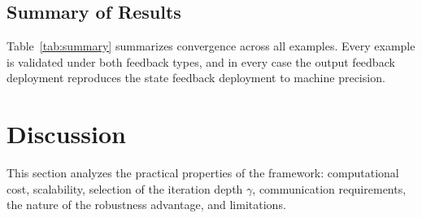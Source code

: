 \documentclass[final,5p,times]{elsarticle}
\theoremstyle{plain}
\theoremstyle{definition}
\theoremstyle{remark}
\begin{document}
\subsection{Summary of Results}
\label{subsec:sim_summary}
Table~\ref{tab:summary} summarizes convergence across all examples. Every example is validated under both feedback types, and in every case the output feedback deployment reproduces the state feedback deployment to machine precision.
\begin{table}[htbp]
\centering
\caption{Summary of Q-learning convergence across examples.}
\label{tab:summary}
\small
\setlength{\tabcolsep}{4pt}
\end{table}
\section{Discussion}
\label{sec:discussion}
This section analyzes the practical properties of the framework: computational cost, scalability, selection of the iteration depth $\gamma$, communication requirements, the nature of the robustness advantage, and limitations.
\end{document}

